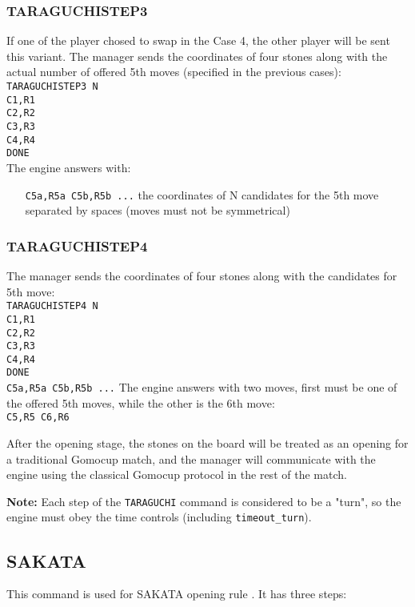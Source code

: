 \documentclass[12pt,a4paper]{article}
\begin{document}
\subsubsection{TARAGUCHISTEP3}
If one of the player chosed to swap in the Case 4, the other player will be sent this variant. The manager sends the coordinates of four stones along with the actual number of offered 5th moves (specified in the previous cases):\\
\texttt{TARAGUCHISTEP3 N}\\
\texttt{C1,R1}\\
\texttt{C2,R2}\\
\texttt{C3,R3}\\
\texttt{C4,R4}\\
\texttt{DONE}\\
The engine answers with:
\begin{enumerate}[leftmargin=7.5em]
\item[\texttt{C5a,R5a C5b,R5b ...}]{the coordinates of N candidates for the 5th move separated by spaces (moves must not be symmetrical)}
\texttt{}
\end{enumerate}

\subsubsection{TARAGUCHISTEP4}
The manager sends the coordinates of four stones along with the candidates for 5th move:\\
\texttt{TARAGUCHISTEP4 N}\\
\texttt{C1,R1}\\
\texttt{C2,R2}\\
\texttt{C3,R3}\\
\texttt{C4,R4}\\
\texttt{DONE}\\
\texttt{C5a,R5a C5b,R5b ...}
The engine answers with two moves, first must be one of the offered 5th moves, while the other is the 6th move:\\
\texttt{C5,R5 C6,R6}

After the opening stage, the stones on the board will be treated as an opening for a traditional Gomocup match, and the manager will communicate with the engine using the classical Gomocup protocol in the rest of the match.

\textbf{Note:} Each step of the \texttt{TARAGUCHI} command is considered to be a "turn", so the engine must obey the time controls (including \texttt{timeout{\_}turn}).


\subsection{SAKATA}
\label{cmd_sakata}
This command is used for SAKATA opening rule \cite{renju_opening_rules}. It has three steps:
\end{document}
